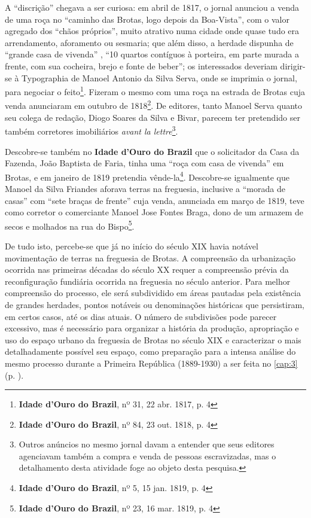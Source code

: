 A ``discrição'' chegava a ser curiosa: em abril de 1817, o jornal anunciou a venda de uma roça no ``caminho das Brotas, logo depois da Boa-Vista'', com o valor agregado dos ``chãos próprios'', muito atrativo numa cidade onde quase tudo era arrendamento, aforamento ou sesmaria; que além disso, a herdade dispunha de ``grande casa de vivenda'' , ``10 quartos contíguos à porteira, em parte murada a frente, com sua cocheira, brejo e fonte de beber''; os interessados deveriam dirigir-se à Typographia de Manoel Antonio da Silva Serva, onde se imprimia o jornal, para negociar o feito\footnote{\textbf{Idade d'Ouro do Brazil}, nº 31, 22 abr. 1817, p. 4}. Fizeram o mesmo com uma roça na estrada de Brotas cuja venda anunciaram em outubro de 1818\footnote{\textbf{Idade d'Ouro do Brazil}, nº 84, 23 out. 1818, p. 4}. De editores, tanto Manoel Serva quanto seu colega de redação, Diogo Soares da Silva e Bivar, parecem ter pretendido ser também corretores imobiliários \textit{avant la lettre}\footnote{Outros anúncios no mesmo jornal davam a entender que seus editores agenciavam também a compra e venda de pessoas escravizadas, mas o detalhamento desta atividade foge ao objeto desta pesquisa.}.

Descobre-se também no \textbf{Idade d'Ouro do Brazil} que o solicitador da Casa da Fazenda, João Baptista de Faria, tinha uma ``roça com casa de vivenda'' em Brotas, e em janeiro de 1819 pretendia vênde-la\footnote{\textbf{Idade d'Ouro do Brazil}, nº 5, 15 jan. 1819, p. 4}. Descobre-se igualmente que Manoel da Silva Friandes aforava terras na freguesia, inclusive a ``morada de casas'' com ``sete braças de frente'' cuja venda, anunciada em março de 1819, teve como corretor o comerciante Manoel Jose Fontes Braga, dono de um armazem de secos e molhados na rua do Bispo\footnote{\textbf{Idade d'Ouro do Brazil}, nº 23, 16 mar. 1819, p. 4}.

De tudo isto, percebe-se que já no início do século XIX havia notável movimentação de terras na freguesia de Brotas. A compreensão da urbanização ocorrida nas primeiras décadas do século XX requer a compreensão prévia da reconfiguração fundiária ocorrida na freguesia no século anterior. Para melhor compreensão do processo, ele será subdividido em áreas pautadas pela existência de grandes herdades, pontos notáveis ou denominações históricas que persistiram, em certos casos, até os dias atuais. O número de subdivisões pode parecer excessivo, mas é necessário para organizar a história da produção, apropriação e uso do espaço urbano da freguesia de Brotas no século XIX e caracterizar o mais detalhadamente possível seu espaço, como preparação para a intensa análise do mesmo processo durante a Primeira República (1889-1930) a ser feita no \autoref{cap:3} (p. \pageref{cap:3}).

